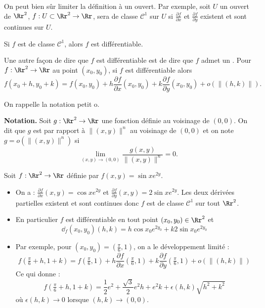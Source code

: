\documentclass[12pt, class=report,crop=false]{standalone}
\begin{document}
{On peut bien sûr limiter la définition à un ouvert. Par exemple, soit $U$ un ouvert de $\Rr^2$, $f : U\subset \Rr^2 \to \Rr$, sera de classe $\mathcal{C}^1$ sur $U$ si $\frac{\partial f}{\partial x}$ et $\frac{\partial f}{\partial y}$ existent et sont continues sur $U$.


\begin{theoreme}
\label{th:foncc1}
Si $f$ est de classe $\mathcal{C}^1$, alors $f$ est différentiable.
\end{theoreme}

Une autre façon de dire que $f$ est différentiable est de dire que $f$ admet un . Pour $f : \Rr^2 \to \Rr$
au point $(x_0,y_0)$, si $f$ est différentiable alors
$$f(x_0+h,y_0+k)=f(x_0,y_0)+h\frac{\partial f}{\partial x}(x_0,y_0)+k\frac{\partial f}{\partial y}(x_0,y_0)+o\left(\|(h,k)\|\right).$$

\bigskip

On rappelle la notation \og{}petit o\fg{}.

\textbf{Notation.} Soit $g :\Rr^2\to \Rr$ une fonction définie au voisinage de $(0,0)$. On dit que $g$ est  par rapport à $\|(x,y)\|^n$ au voisinage de $(0,0)$ et on note $g=o\left(\|(x,y)\|^n\right)$ si 
$$\lim_{(x,y)\to(0,0)}\frac{g(x,y)}{\|(x,y)\|^n}=0.$$

\begin{exemple}
Soit $f : \Rr^2 \to \Rr$ définie par $f(x,y)=\sin x e ^{2y}$.

\begin{itemize}
  \item On a : $\frac{\partial f}{\partial x}(x,y)=\cos x e ^{2y}$ et $\frac{\partial f}{\partial y}(x,y)=2\sin x e ^{2y}$. Les deux dérivées partielles existent et sont continues donc $f$ est de classe $\mathcal{C}^1$ sur tout $\Rr^2$. 
  
  \item En particulier $f$ est différentiable en tout point $(x_0,y_0) \in \Rr^2$ et 
  $$\dd_f (x_0,y_0)(h,k) = h\cos x_0 e ^{2y_0}+k2\sin x_0 e ^{2y_0}$$
  
  \item Par exemple, pour $(x_0,y_0) = (\frac\pi6,1)$, on a le développement limité :
  $$f(\tfrac\pi6+h,1+k) = f(\tfrac\pi6,1) + 
  h\frac{\partial f}{\partial x}(\tfrac\pi6,1)+
  k \frac{\partial f}{\partial y}(\tfrac\pi6,1) + o\left(\|(h,k)\|\right)$$
  Ce qui donne :
 $$f(\tfrac\pi6+h,1+k) = \frac{1}{2}e^2 + \frac{\sqrt3}{2}e^2h + 
 e^2k + \epsilon(h,k)\sqrt{h^2+k^2}$$
 où $\epsilon(h,k) \to 0$ lorsque $(h,k) \to (0,0)$. 
\end{itemize}


\end{exemple}}
\end{document}
